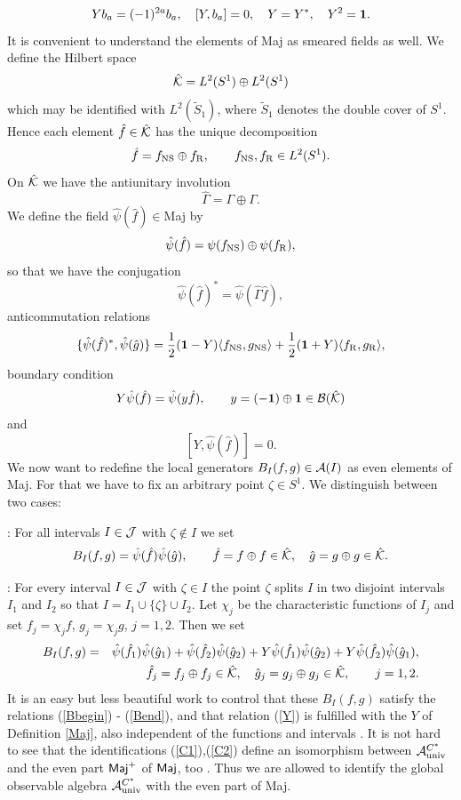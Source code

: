 \documentclass[10pt,a4paper]{article}
\begin{document}
\begin{equation}
Yb_a=(-1)^{2a}b_a,\quad [Y,b_a]=0,\quad Y=Y^*,\quad Y^2={\bf 1}.
\end{equation}
It is convenient to understand the elements of {\sf Maj} as smeared
fields as well. We define the Hilbert space
\[ \hat{\cal K} = L^2(S^1) \oplus L^2(S^1) \]
which may be identified with $L^2({\tilde{S}}_1)$, where
${\tilde{S}}_1$ denotes the double cover of $S^1$.
Hence each element $\hat{f}\in\hat{\cal K}$ has the
unique decomposition
\[ \hat{f} = f_{\rm NS} \oplus f_{\rm R}, \qquad f_{\rm NS},f_{\rm R}
\in L^2(S^1). \]
On $\hat{\cal K}$ we have the antiunitary involution
\[ \hat{\Gamma}=\Gamma \oplus \Gamma. \]
We define the field $\hat{\psi}(\hat{f})\in${\sf Maj} by
\[ \hat{\psi}(\hat{f}) = \psi(f_{\rm NS}) \oplus \psi(f_{\rm R}),\]
so that we have the conjugation
\[ \hat{\psi}(\hat{f})^* =
\hat{\psi}(\hat{\Gamma}\hat{f}),\]
anticommutation relations
\[ \{ \hat{\psi}(\hat{f})^*,\hat{\psi}(\hat{g}) \} =
\frac{1}{2} ({\bf 1}-Y) \langle f_{\rm NS}, g_{\rm NS} \rangle
+ \frac{1}{2} ({\bf 1}+Y) \langle f_{\rm R}, g_{\rm R}
\rangle, \]
boundary condition
\[ Y \hat{\psi}(\hat{f}) = \hat{\psi}(y\hat{f}),
\qquad y=(-{\bf 1})\oplus {\bf 1} \in
{\cal B}(\hat{\cal K}) \]
and
\[ [ Y , \hat{\psi}(\hat{f}) ] = 0. \]
We now want to redefine the local generators $B_I(f,g)
\in{\cal A}(I)$ as even elements of {\sf Maj}. For that we
have to fix an arbitrary point $\zeta\in S^1$. We
distinguish between two cases:

: For all intervals $I\in{\cal J}$
with $\zeta\notin I$ we set
\begin{equation}
\label{C1}
B_I(f,g) = \hat{\psi}(\hat{f})\hat{\psi}(\hat{g}),
\qquad \hat{f}=f\oplus f \in \hat{\cal K},\quad
\hat{g}=g\oplus g \in \hat{\cal K}.
\end{equation}

: For every interval $I\in{\cal J}$
with $\zeta\in I$ the point $\zeta$ splits $I$ in two
disjoint intervals $I_1$ and $I_2$ so that $I=I_1 \cup
\{\zeta\} \cup I_2$. Let $\chi_j$ be the characteristic
functions of $I_j$ and set $f_j=\chi_j f$, $g_j=\chi_j g$,
$j=1,2$. Then we set
\begin{eqnarray}
\label{C2}
B_I(f,g) &=& \hat{\psi} ({\hat{f}}_1) \hat{\psi}
({\hat{g}}_1) + \hat{\psi} ({\hat{f}}_2) \hat{\psi}
({\hat{g}}_2) + Y \hat{\psi} ({\hat{f}}_1) \hat{\psi}
({\hat{g}}_2) + Y \hat{\psi} ({\hat{f}}_2) \hat{\psi}
({\hat{g}}_1), \\
&&{\hat{f}}_j = f_j \oplus f_j \in \hat{\cal K},\quad
{\hat{g}}_j =g_j \oplus g_j \in \hat{\cal K}, \qquad
j=1,2. \nonumber
\end{eqnarray}
It is an easy but less beautiful work to control that
these $B_I(f,g)$ satisfy the relations (\ref{Bbegin}) -
(\ref{Bend}), and
that relation (\ref{Y}) is fulfilled with the $Y$ of
Definition \ref{Maj}, also independent of the functions and
intervals \cite{ich}. It is not hard to see that the
identifications (\ref{C1}),(\ref{C2}) define an
isomorphism between ${\cal A}_{\rm univ}^{C^*}$ and
the even part ${\sf Maj}^+$ of ${\sf Maj}$, too \cite{Szl2}.
Thus we are allowed to identify the global observable algebra
${\cal A}_{\rm univ}^{C^*}$ with the even part of {\sf Maj}.
\end{document}
